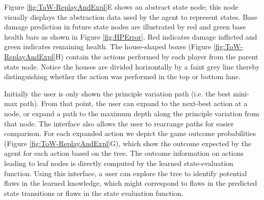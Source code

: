\documentclass{article}
\begin{document}
Figure \ref{fig:ToW-ReplayAndExpl}{E} shows an abstract state node; this node visually displays the abstraction data used by the agent to represent states. Base damage prediction in future state nodes are illustrated by red and green base health bars as shown in Figure \ref{fig:HPError}. Red indicates damage inflicted and green indicates remaining health. The house-shaped boxes (Figure \ref{fig:ToW-ReplayAndExpl}H) contain the actions performed by each player from the parent state node. Notice the houses are divided horizontally by a faint grey line thereby distinguishing whether the action was performed in the top or bottom lane.

Initially the user is only shown the principle variation path (i.e. the best mini-max path). From that point, the user can expand to the next-best action at a node, or expand a path to the maximum depth along the principle variation from that node. The interface also allows the user to rearrange paths for easier comparison. For each expanded action we depict the game outcome probabilities (Figure \ref{fig:ToW-ReplayAndExpl}G), which show the outcome expected by the agent for each action based on the tree. The outcome information on actions leading to leaf nodes is directly computed by the learned state-evaluation function. Using this interface, a user can explore the tree to identify potential flaws in the learned knowledge, which might correspond to flaws in the predicted state transitions or flaws in the state evaluation function. 


\end{document}
